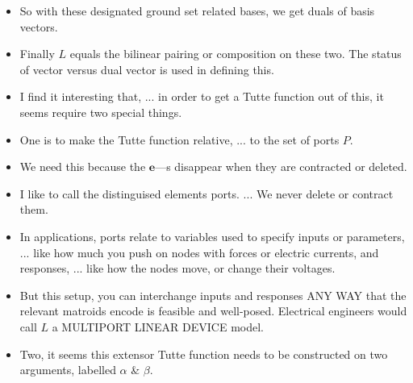 \documentclass[14pt]{extarticle}
\begin{document}
{\begin{itemize}
  
\item  So with these designated ground set related bases, we get duals of basis vectors.

\item
  Finally $L$ equals the bilinear pairing or composition on these two.  The status
  of vector versus dual vector is used in defining this.
  

\item
  I find it interesting that, ... in order to get a Tutte function out
  of this, it seems require two special things.

\item
One is to make the Tutte function relative, ... to the set of ports $P$.

\item
  We need this because the $\mathbf{e}$---s  disappear when they are contracted or deleted.

\item
  I like to call the distinguised elements ports. ... We never delete or contract them.


\item In applications, ports relate to variables used to specify inputs
  or parameters, ... like how much you push on nodes with forces or electric currents,
  and responses, ... like how the nodes move, or change their voltages.

\item But this setup, you can interchange inputs and responses ANY WAY that the
  relevant matroids encode is feasible and well-posed.  Electrical engineers would
  call $L$ a MULTIPORT LINEAR DEVICE model.


\item
  Two, it seems this extensor Tutte function needs to be constructed on 
  two arguments, labelled $\alpha$ \& $\beta$.



\end{itemize}}
\end{document}
